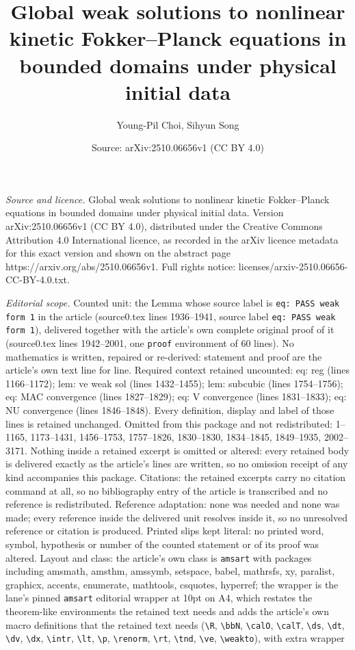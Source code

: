 \documentclass[10pt,a4paper]{amsart}
\title[Global weak solutions to nonlinear kinetic Fokker--Planck eq]{Global weak solutions to nonlinear kinetic Fokker--Planck equations in bounded domains under physical initial data}
\author{Young-Pil Choi, Sihyun Song}
\date{Source: arXiv:2510.06656v1 (CC BY 4.0)}
\begin{document}
\maketitle

\noindent\emph{Source and licence.} Global weak solutions to nonlinear kinetic Fokker--Planck equations in bounded domains under physical initial data. Version arXiv:2510.06656v1 (CC BY 4.0), distributed under the Creative Commons Attribution 4.0 International licence, as recorded in the arXiv licence metadata for this exact version and shown on the abstract page https://arxiv.org/abs/2510.06656v1. Full rights notice: licenses/arxiv-2510.06656-CC-BY-4.0.txt.\par\smallskip

\noindent\textit{Editorial scope.} Counted unit: the Lemma whose source label is \texttt{eq: PASS weak form 1} in the article (source0.tex lines 1936--1941, source label \texttt{eq: PASS weak form 1}), delivered together with the article's own complete original proof of it (source0.tex lines 1942--2001, one \texttt{proof} environment of 60 lines). No mathematics is written, repaired or re-derived: statement and proof are the article's own text line for line. Required context retained uncounted: eq: reg (lines 1166--1172); lem: ve weak sol (lines 1432--1455); lem: subcubic (lines 1754--1756); eq: MAC convergence (lines 1827--1829); eq: V convergence (lines 1831--1833); eq: NU convergence (lines 1846--1848). Every definition, display and label of those lines is retained unchanged. Omitted from this package and not redistributed: 1--1165, 1173--1431, 1456--1753, 1757--1826, 1830--1830, 1834--1845, 1849--1935, 2002--3171. Nothing inside a retained excerpt is omitted or altered: every retained body is delivered exactly as the article's lines are written, so no omission receipt of any kind accompanies this package. Citations: the retained excerpts carry no citation command at all, so no bibliography entry of the article is transcribed and no reference is redistributed. Reference adaptation: none was needed and none was made; every reference inside the delivered unit resolves inside it, so no unresolved reference or citation is produced. Printed slips kept literal: no printed word, symbol, hypothesis or number of the counted statement or of its proof was altered. Layout and class: the article's own class is \texttt{amsart} with packages including amsmath, amsthm, amssymb, setspace, babel, mathrsfs, xy, paralist, graphicx, accents, enumerate, mathtools, csquotes, hyperref; the wrapper is the lane's pinned \texttt{amsart} editorial wrapper at 10pt on A4, which restates the theorem-like environments the retained text needs and adds the article's own macro definitions that the retained text needs (\texttt{\textbackslash R}, \texttt{\textbackslash bbN}, \texttt{\textbackslash calO}, \texttt{\textbackslash calT}, \texttt{\textbackslash ds}, \texttt{\textbackslash dt}, \texttt{\textbackslash dv}, \texttt{\textbackslash dx}, \texttt{\textbackslash intr}, \texttt{\textbackslash lt}, \texttt{\textbackslash p}, \texttt{\textbackslash renorm}, \texttt{\textbackslash rt}, \texttt{\textbackslash tnd}, \texttt{\textbackslash ve}, \texttt{\textbackslash weakto}), with extra wrapper 
\end{document}
